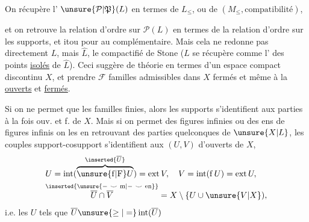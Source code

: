 On récupère l' $\unsure{\mathcal P|\mathfrak P}(L)$ en termes de $L_{\leq}$, ou de $(M_{\leq},\text{compatibilité})$,


et on retrouve la relation d'ordre sur $\mathcal P(L)$ en termes de la relation d'ordre sur les supports, et itou pour  au complémentaire. Mais cela ne redonne pas directement $L$, mais $\widehat L$, le compactifié de Stone ($L$ se récupère  comme l' des points \uline{isolés} de $\widehat L$). Ceci suggère de  théorie en termes d'un espace compact  discontinu $X$, et  prendre $\mathcal F$ familles admissibles dans $X$ fermés et même à la  \uline{ouverts} et \uline{fermés}.

Si on ne permet que les familles finies, alors les supports   s'identifient aux parties à la fois ouv. et f. de $X$. Mais
si on permet des figures infinies ou des ens de figures infinis on les  en retrouvant   des parties  quelconques de $\unsure{X|L}$,  les  couples support-cosupport s'identifient aux   $(U,V)$ d'ouverts de $X$,
\[
\begin{aligned}
& U=\operatorname{int}(\overbrace{\unsure{\mathrm f|\mathrm F}U}^{\inserted{\overline U}})=\operatorname{ext}V,\quad
 V=\operatorname{int}(\mathrm f\,U)=\operatorname{ext}U,\\
& \overset{\inserted{\unsure{-\ \smile\ \mathrm m|-\ \smile\ \mathrm{en}}}}{\overline U\cap\overline V} = X\setminus\{U\cup\unsure{V|X}),
\end{aligned}
\]
i.e. les  $U$ tels que $\overline U\unsure{\geq|= }\operatorname{int}(\overline U)$
